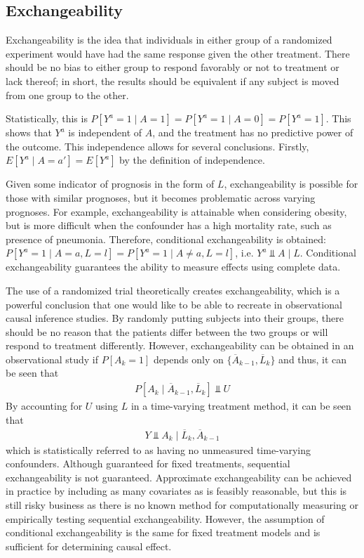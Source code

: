 \subsection{Exchangeability} \label{exchangeability} 
Exchangeability is the idea that individuals in either group of a randomized experiment would have had the same response given the other treatment. \cite{hernan_robins_2016}  There should be no bias to either group to respond favorably or not to treatment or lack thereof; in short, the results should be equivalent if any subject is moved from one group to the other.  
 
Statistically, this is $P[Y^a = 1 \mid A = 1] = P[Y^a = 1 \mid A = 0] = P[Y^a = 1]$.  This shows that $Y^a$ is independent of $A$, and the treatment has no predictive power of the outcome.  This independence allows for several conclusions.  Firstly, $E[Y^a \mid A = a'] = E[Y^a]$ by the definition of independence.  

Given some indicator of prognosis in the form of $L$, exchangeability is possible for those with similar prognoses, but it becomes problematic across varying prognoses.  For example, exchangeability is attainable when considering obesity, but is more difficult when the confounder has a high mortality rate, such as presence of pneumonia.  Therefore, conditional exchangeability is obtained: $P[Y^a = 1 \mid A = a, L=l] = P[Y^a = 1 \mid A \neq a, L=l]$, i.e. $Y^{a} \Perp A\mid L$. \cite{hernan_robins_2016}  Conditional exchangeability guarantees the ability to measure effects using complete data.  

The use of a randomized trial theoretically creates exchangeability, which is a powerful conclusion that one would like to be able to recreate in observational causal inference studies.   By randomly putting subjects into their groups, there should be no reason that the patients differ between the two groups or will respond to treatment differently.  However, exchangeability can be obtained in an observational study if $P[A_k = 1]$ depends only on $\{\overline{A}_{k-1}, \overline{L}_{k} \}$ and thus, it can be seen that 
\begin{align}
P[A_k \mid \overline{A}_{k-1}, \overline{L}_{k} ] \Perp U
\end{align}
By accounting for $U$ using $L$ in a time-varying treatment method, it can be seen that 
\begin{align} 
Y \Perp A_k \mid  \overline{L}_{k}, \overline{A}_{k-1}
\end{align}
which is statistically referred to as having no unmeasured time-varying confounders.  Although guaranteed for fixed treatments, sequential exchangeability is not guaranteed.\cite{wright2015international}  Approximate exchangeability can be achieved in practice by including as many covariates as is feasibly reasonable, but this is still risky business as there is no known method for computationally measuring or empirically testing sequential exchangeability.  However, the assumption of conditional exchangeability is the same for fixed treatment models and is sufficient for determining causal effect. 

